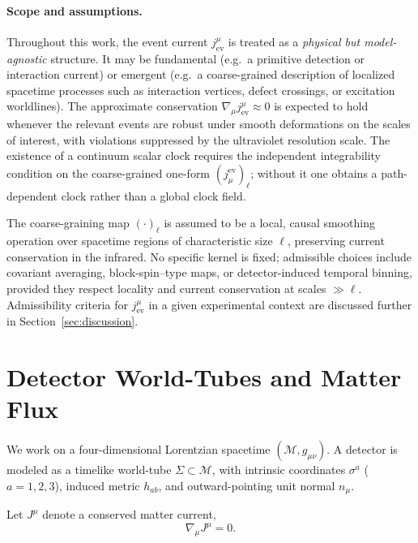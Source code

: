 \documentclass[pdflatex,sn-mathphys-num]{sn-jnl}
\theoremstyle{thmstylethree}
\theoremstyle{thmstyleone}
\theoremstyle{thmstyletwo}
\numberwithin{equation}{section}
\newcommand{\Sig}{\Sigma}
\begin{document}
        \paragraph{Scope and assumptions.}
            Throughout this work, the event current $j^\mu_{\mathrm{ev}}$ is treated as a \emph{physical but model-agnostic} structure. It may be fundamental (e.g.\ a primitive detection or interaction current) or emergent (e.g.\ a coarse-grained description of localized spacetime processes such as interaction vertices, defect crossings, or excitation worldlines). The approximate conservation $\nabla_\mu j^\mu_{\mathrm{ev}}\approx 0$ is expected to hold whenever the relevant events are robust under smooth deformations on the scales of interest, with violations suppressed by the ultraviolet resolution scale. The existence of a continuum scalar clock requires the independent integrability condition on the coarse-grained one-form $(j^{\mathrm{ev}}_\mu)_\ell$; without it one obtains a path-dependent clock rather than a global clock field.
            
            The coarse-graining map $(\cdot)_\ell$ is assumed to be a local, causal smoothing operation over spacetime regions of characteristic size $\ell$, preserving current conservation in the infrared. No specific kernel is fixed; admissible choices include covariant averaging, block-spin--type maps, or detector-induced temporal binning, provided they respect locality and current conservation at scales $\gg\ell$.
            Admissibility criteria for $j^\mu_{\mathrm{ev}}$ in a given experimental context are discussed further in Section~\ref{sec:discussion}.

    \section{Detector World-Tubes and Matter Flux}
    
    We work on a four-dimensional Lorentzian spacetime $(\mathcal{M},g_{\mu\nu})$. A detector is modeled as a timelike world-tube $\Sig \subset \mathcal{M}$, with intrinsic coordinates $\sigma^a$ ($a=1,2,3$), induced metric $h_{ab}$, and outward-pointing unit normal $n_\mu$.
    
    Let $J^\mu$ denote a conserved matter current,
    \begin{equation}
        \nabla_\mu J^\mu = 0 .
    \end{equation}
    
\end{document}
